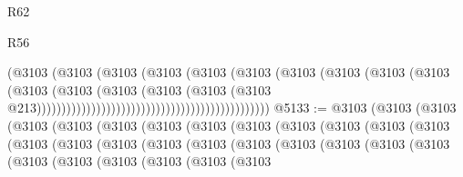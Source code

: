 \begin{lexlean}{R62}
\begin{lexlean}{R56}
\begin{coremodule}
{{{{{{{{{{{{{{{{{{{{{{{{{{{{{{{{{{{{{{{{{{{{{{{{{{{{{{{{{{{{{{{{{{{{{{{{{{{{{{{{{{{{{{{{{{{{{{{{{{{{{{{{{{{{{{{{{{{{{{{{{{{{{{{{{{{{{{{{{{{{{{{{{{{{{{{{{{{{{{{{{{{{{{{{{{{{{{{{{{{{{{{{{{{{{{{{{{{{{{{{{{{{{{{{{{{                                                                  (@3103
                                                                    (@3103
                                                                      (@3103
                                                                        (@3103
                                                                          (@3103
                                                                            (@3103
                                                                              (@3103
                                                                                (@3103
                                                                                  (@3103
                                                                                    (@3103
                                                                                      (@3103
                                                                                        (@3103
                                                                                          (@3103
                                                                                            (@3103
                                                                                              (@3103
                                                                                                (@3103
                                                                                                  @213)))))))))))))))))))))))))))))))))))))))))))))))
@5133 := @3103
    (@3103
      (@3103
        (@3103
          (@3103
            (@3103
              (@3103
                (@3103
                  (@3103
                    (@3103
                      (@3103
                        (@3103
                          (@3103
                            (@3103
                              (@3103
                                (@3103
                                  (@3103
                                    (@3103
                                      (@3103
                                        (@3103
                                          (@3103
                                            (@3103
                                              (@3103
                                                (@3103
                                                  (@3103
                                                    (@3103
                                                      (@3103
                                                        (@3103
                                                          (@3103
}}}}}}}}}}}}}}}}}}}}}}}}}}}}}}}}}}}}}}}}}}}}}}}}}}}}}}}}}}}}}}}}}}}}}}}}}}}}}}}}}}}}}}}}}}}}}}}}}}}}}}}}}}}}}}}}}}}}}}}}}}}}}}}}}}}}}}}}}}}}}}}}}}}}}}}}}}}}}}}}}}}}}}}}}}}}}}}}}}}}}}}}}}}}}}}}}}}}}}}}}}}}}}}}}}}
\end{coremodule}
\end{lexlean}
\end{lexlean}

